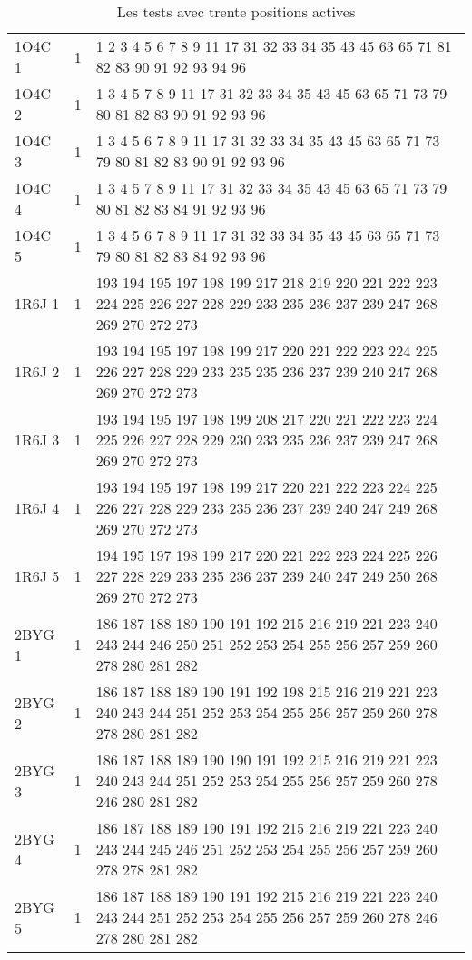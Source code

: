 \begin{table}[!htbp]
{\begin{tabular}{lll}
        1O4C 1 & 1 & 1 2 3 4 5 6 7 8 9 11 17 31 32 33 34 35 43 45 63 65 71 81 82 83 90 91 92 93 94 96\\
        1O4C 2 & 1 & 1 3 4 5 7 8 9 11 17 31 32 33 34 35 43 45 63 65 71 73 79 80 81 82 83 90 91 92 93 96\\
        1O4C 3 & 1 & 1 3 4 5 6 7 8 9 11 17 31 32 33 34 35 43 45 63 65 71 73 79 80 81 82 83 90 91 92 93 96 \\
        1O4C 4 & 1 & 1 3 4 5 7 8 9 11 17 31 32 33 34 35 43 45 63 65 71 73 79 80 81 82 83 84 91 92 93 96 \\
        1O4C 5 & 1 & 1 3 4 5 6 7 8 9 11 17 31 32 33 34 35 43 45 63 65 71 73 79 80 81 82 83 84 92 93 96 \\
        1R6J 1 & 1 & 193 194 195 197 198 199 217 218 219 220 221 222 223 224 225 226 227 228 229 233 235 236 237 239 247 268 269 270 272 273 \\
        1R6J 2 & 1 & 193 194 195 197 198 199 217 220 221 222 223 224 225 226 227 228 229 233 235 235 236 237 239 240 247 268 269 270 272 273 \\
        1R6J 3 & 1 & 193 194 195 197 198 199 208 217 220 221 222 223 224 225 226 227 228 229 230 233 235 236 237 239 247 268 269 270 272 273 \\
        1R6J 4 & 1 & 193 194 195 197 198 199 217 220 221 222 223 224 225 226 227 228 229 233 235 236 237 239 240 247 249 268 269 270 272 273 \\
        1R6J 5 & 1 & 194 195 197 198 199 217 220 221 222 223 224 225 226 227 228 229 233 235 236 237 239 240 247 249 250 268 269 270 272 273 \\
        2BYG 1 & 1 & 186 187 188 189 190 191 192 215 216 219 221 223 240 243 244 246 250 251 252 253 254 255 256 257 259 260 278 280 281 282 \\
        2BYG 2 & 1 & 186 187 188 189 190 191 192 198 215 216 219 221 223 240 243 244 251 252 253 254 255 256 257 259 260 278 278 280 281 282 \\
        2BYG 3 & 1 & 186 187 188 189 190 190 191 192 215 216 219 221 223 240 243 244 251 252 253 254 255 256 257 259 260 278 246 280 281 282 \\
        2BYG 4 & 1 & 186 187 188 189 190 191 192 215 216 219 221 223 240 243 244 245 246 251 252 253 254 255 256 257 259 260 278 278 281 282 \\
        2BYG 5 & 1 & 186 187 188 189 190 191 192 215 216 219 221 223 240 243 244 251 252 253 254 255 256 257 259 260 278 246 278 280 281 282 \\

        \bottomrule

      \end{tabular}   
}   
      \caption{Les tests avec trente positions actives}
\label{tab:test30}      
    \end{table}






